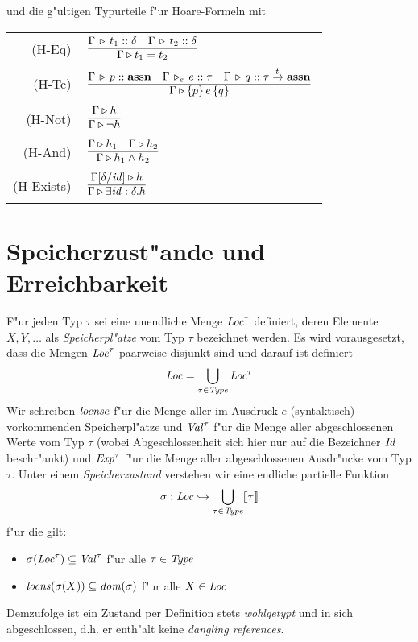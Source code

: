 \documentclass[12pt,a4paper,bigheadings]{scrartcl}
\newcommand{\semantic}[1]{\ensuremath{\llbracket#1\rrbracket}}
\newcommand{\assn}{\ensuremath{\mathbf{assn}}}
\newcommand{\locns}{\name{locns}}
\newcommand{\tto}{\ensuremath{\xrightarrow{t}}}
\newcommand{\RN}[1]{\mbox{{\sc (#1)}}}
\newcommand{\Tje}[3]{#1 \,\tr_e\, #2\cc#3}
\begin{document}
und die g"ultigen Typurteile f"ur Hoare-Formeln mit \\[3mm]
\begin{tabular}{rl}
  \RN{H-Eq} & $\regel{\Tj{\Gamma}{t_1}{\delta} \quad \Tj{\Gamma}{t_2}{\delta}}
                     {\Tjh{\Gamma}{t_1 = t_2}}$ \\[1mm]
  \RN{H-Tc} & $\regel{\Tj{\Gamma}{p}{\assn} \quad \Tje{\Gamma}{e}{\tau} \quad \Tj{\Gamma}{q}{\tau} \tto \assn}
                     {\Tjh{\Gamma}{\triple{p}{e}{q}}}$ \\[1mm]
  \RN{H-Not} & $\regel{\Tjh{\Gamma}{h}}
                      {\Tjh{\Gamma}{\neg h}}$ \\[1mm]
  \RN{H-And} & $\regel{\Tjh{\Gamma}{h_1} \quad \Tjh{\Gamma}{h_2}}
                      {\Tjh{\Gamma}{h_1 \wedge h_2}}$ \\[1mm]
  \RN{H-Exists} & $\regel{\Tjh{\Gamma[\delta/\id]}{h}}
                         {\Tjh{\Gamma}{\exists \id:\delta.h}}$
\end{tabular}


\section{Speicherzust"ande und Erreichbarkeit}

F"ur jeden Typ $\tau$ sei eine unendliche Menge ${\text{\it Loc\/}}^\tau$ definiert, deren Elemente $X,Y,\ldots$
als {\em Speicherpl"atze} vom Typ $\tau$ bezeichnet werden. Es wird vorausgesetzt, dass die Mengen
${\text{\it Loc\/}}^\tau$ paarweise disjunkt sind und darauf ist definiert
\[
  {\text{\it Loc\/}} = \bigcup_{\tau\in{\text{\it Type\/}}} {\text{\it Loc\/}}^\tau
\]
Wir schreiben $\locns{e}$ f"ur die Menge aller im Ausdruck $e$ (syntaktisch) vorkommenden Speicherpl"atze
und ${\text{\it Val\/}}^\tau$ f"ur die Menge aller abgeschlossenen Werte vom Typ $\tau$ (wobei Abgeschlossenheit sich
hier nur auf die Bezeichner ${\text{\it Id\/}}$ beschr"ankt) und ${\text{\it Exp\/}}^\tau$ f"ur die Menge aller abgeschlossenen
Ausdr"ucke vom Typ $\tau$. Unter einem {\em Speicherzustand} verstehen wir eine
endliche partielle Funktion
\[
  \sigma: \Loc \pto \bigcup_{\tau\in\Type} \semantic{\tau}
\]
f"ur die gilt:
\begin{itemize}
  \item $\sigma({\text{\it Loc\/}}^\tau) \subseteq {\text{\it Val\/}}^\tau$ f"ur alle $\tau\in{\text{\it Type\/}}$
  \item $\locns(\sigma(X)) \subseteq \dom{\sigma}$ f"ur alle $X\in{\text{\it Loc\/}}$
\end{itemize}
Demzufolge ist ein Zustand per Definition stets {\em wohlgetypt} und in sich abgeschlossen,
d.h. er enth"alt keine {\em dangling references}.
\end{document}
